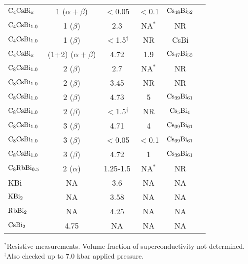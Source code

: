\begin{table}
\begin{center}
\begin{tabular}{|lc|cccc|}
$\rm C_4CsBi_{x}$ & 1 ($\alpha + \beta$) & $<$0.05 & $<$0.1 & $\rm Cs_{48}Bi_{52}$ & \cite{stang88}\\
$\rm C_4CsBi_{1.0}$ & 1 ($\beta$) & 2.3 & NA$^*$ & NR &\cite{mcrae85}\\
$\rm C_4CsBi_{1.0}$ & 1 ($\beta$) & $<$1.5$^{\dagger}$ & NR & CsBi & \cite{yang88}\\
$\rm C_4CsBi_{x}$ & (1+2) ($\alpha + \beta$) & 4.72 & 1.9 & $\rm Cs_{47}Bi_{53}$ & \cite{stang88}\\
$\rm C_8CsBi_{1.0}$ & 2 ($\beta$) & 2.7 & NA$^*$ & NR & \cite{mcrae85}\\
$\rm C_8CsBi_{1.0}$ & 2 ($\beta$) & 3.45 & NR & NR & \cite{bendriss86}\\
$\rm C_8CsBi_{1.0}$ & 2 ($\beta$) & 4.73 & 5 & $\rm Cs_{39}Bi_{61}$ & \cite{stang88}\\
$\rm C_8CsBi_{1.0}$ & 2 ($\beta$) & $<$1.5$^{\dagger}$ & NR & $\rm Cs_5Bi_4$ & \cite{yang88}\\
$\rm C_8CsBi_{1.0}$ & 3 ($\beta$) & 4.71 & 4 & $\rm Cs_{39}Bi_{61}$ & \cite{stang88}\\
$\rm C_8CsBi_{1.0}$ & 3 ($\beta$) & $<$0.05 & $<$0.1 & $\rm Cs_{39}Bi_{61}$ & \cite{stang88}\\
$\rm C_8CsBi_{1.0}$ & 3 ($\beta$) & 4.72 & 1 & $\rm Cs_{39}Bi_{61}$ & \cite{stang88}\\
$\rm C_8RbBi_{0.5}$ & 2 ($\alpha$) & 1.25-1.5 & NA$^*$ & NR & \cite{mcrae85}\\
KBi & NA &  3.6 & NA & NA & \cite{bendriss86}\\
$\rm KBi_2$ & NA & 3.58 & NA & NA & \cite{mcrae85}\\
$\rm RbBi_2$ & NA & 4.25 & NA & NA & \cite{mcrae85}\\
$\rm CsBi_2$ & 4.75 & NA & NA & NA &\cite{mcrae85}\\
\hline
\end{tabular}
\end{center}
$^*$Resistive measurements.  Volume fraction of superconductivity not determined.\\
$^{\dagger}$Also checked up to 7.0 kbar applied pressure.\\
\end{table}

